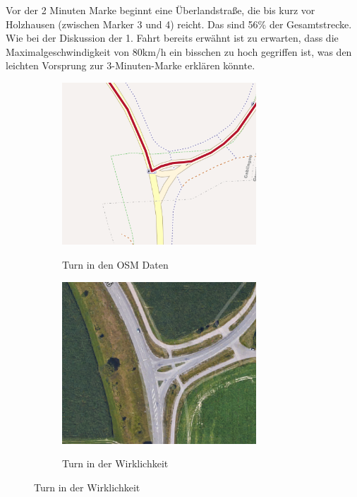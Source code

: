 \documentclass[12pt,a4paper]{article}
\begin{document}
Vor der 2 Minuten Marke beginnt eine Überlandstraße, die bis kurz vor Holzhausen (zwischen Marker 3 und 4) reicht. Das sind 56\% der Gesamtstrecke. Wie bei der Diskussion der 1. Fahrt bereits erwähnt ist zu erwarten, dass die Maximalgeschwindigkeit von 80km/h ein bisschen zu hoch gegriffen ist, was den leichten Vorsprung zur 3-Minuten-Marke erklären könnte.

\begin{figure}[h]
\centering
\caption{Fahrt 3 -- Vergleich eines Turns}
\label{fig:turn}
\begin{subfigure}{0.49\textwidth}
\centering
\includegraphics[width = 0.80\textwidth]{../media/Fahrt3_Turn.png} \\
\caption{Turn in den OSM Daten}
\label{fig:turnosm}
\end{subfigure}
\begin{subfigure}{0.49\textwidth}
\centering
\includegraphics[width = 0.80\textwidth]{../media/Fahrt3_actualturn.png} \\
\caption{Turn in der Wirklichkeit}
\label{fig:turnworld}
\end{subfigure}
\end{figure}
\end{document}
